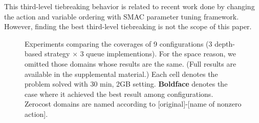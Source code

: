 This third-level tiebreaking behavior is related to recent work
\cite{vallati2015effective} done by changing the action and variable
ordering with SMAC parameter tuning framework. However, finding the best
third-level tiebreaking is not the scope of this paper.

% 



\begin{figure}[tb]
 \centering
 
 \caption{Experiments
 comparing the coverages of 9 configurations (3 depth-based strategy
 $\times$ 3 queue implementions). For the space reason, we omitted those
 domains whose results are the same. (Full results are available in the
 supplemental material.) Each cell denotes the problem solved with 30
 min, 2GB setting. \textbf{Boldface} denotes the case where it achieved
 the best result among configurations. Zerocost domains are named
 according to [original]-[name of nonzero action].}
 \label{depth}
\end{figure}

